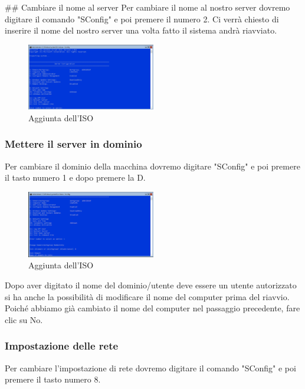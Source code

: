 \documentclass[../main.tex]{subfiles}
\begin{document}
## Cambiare il nome al server
Per cambiare il nome al nostro server dovremo digitare il comando "SConfig" e poi premere il numero 2. Ci verrà chiesto di inserire il nome del nostro server una volta fatto il sistema andrà riavviato.

\begin{figure}[h]
    \centering
    \includegraphics[width=0.5\textwidth]{Images/coreConf1.PNG}
    \caption{Aggiunta dell'ISO}
\end{figure}


\subsubsection{ Mettere il server in dominio}
Per cambiare il dominio della macchina dovremo digitare "SConfig" e poi premere il tasto numero 1 e dopo premere la D.

\begin{figure}[h]
    \centering
    \includegraphics[width=0.5\textwidth]{Images/coreConf2.PNG}
    \caption{Aggiunta dell'ISO}
\end{figure}

Dopo aver digitato il nome del dominio/utente deve essere un utente autorizzato si ha anche la possibilità di modificare il nome del computer prima del riavvio. Poiché abbiamo già cambiato il nome del computer nel passaggio precedente, fare clic su No.



\subsubsection{Impostazione delle rete }
Per cambiare l’impostazione di rete dovremo digitare il comando "SConfig" e poi premere il tasto numero 8.
\end{document}
